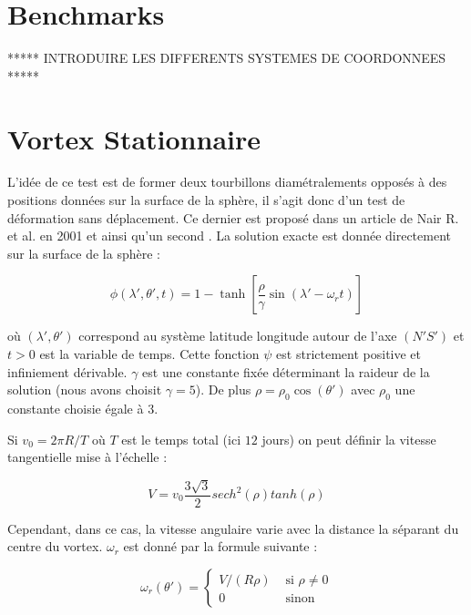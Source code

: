 \section{Benchmarks}

***** INTRODUIRE LES DIFFERENTS SYSTEMES DE COORDONNEES *****

\section{Vortex Stationnaire}

L'idée de ce test est de former deux tourbillons diamétralements opposés à des positions données sur la surface de la sphère, il s'agit donc d'un test de déformation sans déplacement. Ce dernier est proposé dans un article de Nair R. et al. en 2001 \cite{Nair2001} et ainsi qu'un second \cite{Nair1999}.
La solution exacte est donnée directement sur la surface de la sphère :

\begin{equation}
\phi ( \lambda' , \theta', t ) = 1 - \tanh \left[ \dfrac{\rho}{\gamma} \sin ( \lambda' - \omega_r t ) \right]
\label{NM_exacte}
\end{equation}

où $( \lambda' , \theta' )$ correspond au système latitude longitude autour de l'axe $(N'S')$ et $t>0$ est la variable de temps. Cette fonction $\psi$ est strictement positive et infiniement dérivable. $\gamma$ est une constante fixée déterminant la raideur de la solution (nous avons choisit $\gamma = 5$). De plus $\rho = \rho_0 \cos ( \theta' )$ avec $\rho_0$ une constante choisie égale à $3$.

Si $v_0 = 2 \pi R / T$ où $T$ est le temps total (ici $12$ jours) on peut définir la vitesse tangentielle mise à l'échelle :

\begin{equation}
  V = v_0 \dfrac{3 \sqrt{3} }{2} sech^2 ( \rho ) tanh ( \rho )
  \label{vitesse_tangentielle}
\end{equation} 

Cependant, dans ce cas, la vitesse angulaire varie avec la distance la séparant du centre du vortex. $\omega_r$ est donné par la formule suivante :

\begin{equation}
   \omega_r ( \theta' ) = \left\{ 
   \begin{array}{ll}
      V/( R \rho ) & \text{ si } \rho \neq 0 \\
      0 & \text{ sinon }
   \end{array}
   \right.
\label{vitesse_angulaire}
\end{equation}

